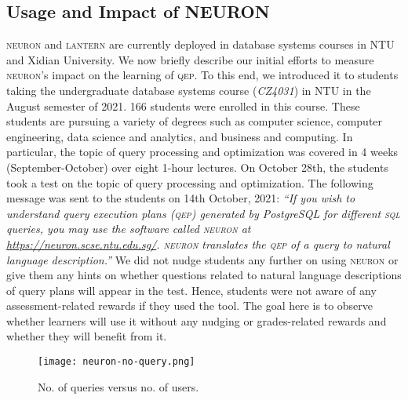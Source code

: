 \documentclass[11pt]{article}
\begin{document}
\subsection{Usage and Impact of NEURON}
\textsc{neuron} and \textsc{lantern} are currently deployed in database systems courses in NTU and Xidian University. We now briefly describe our initial efforts to measure \textsc{neuron}'s impact on the learning  of \textsc{qep}. To this end, we introduced it to students taking the undergraduate database systems course (\textit{CZ4031}) in NTU in the August semester of 2021. 166 students were enrolled in this course. These students are  pursuing a variety of degrees such as computer science, computer engineering, data science and analytics, and business and computing. In particular, the topic of query processing and optimization was covered in 4 weeks (September-October) over eight 1-hour lectures. On October 28th, the students took a test on the topic of query processing and optimization. The following message was sent to the students on 14th October, 2021: \textit{``If you wish to understand query execution plans (\textsc{qep}) generated by PostgreSQL for different \textsc{sql} queries, you may use the software called \textsc{neuron} at \url{https://neuron.scse.ntu.edu.sg/}. \textsc{neuron} translates the \textsc{qep} of a query to natural language description.'' }  We did not nudge students any further on using \textsc{neuron} or give them any hints on whether questions related to natural language descriptions of query plans will appear in the test. Hence, students were not aware of any assessment-related rewards if they used the tool. The goal here is to observe whether learners will use it without any nudging or grades-related rewards and whether they will benefit from it.

\begin{figure}[t]
\centering
\texttt{[image: neuron-no-query.png]}
\vspace{0ex}\caption{No. of queries versus no. of users.}
\label{fig:query}
\vspace{0ex}\end{figure}
\end{document}
